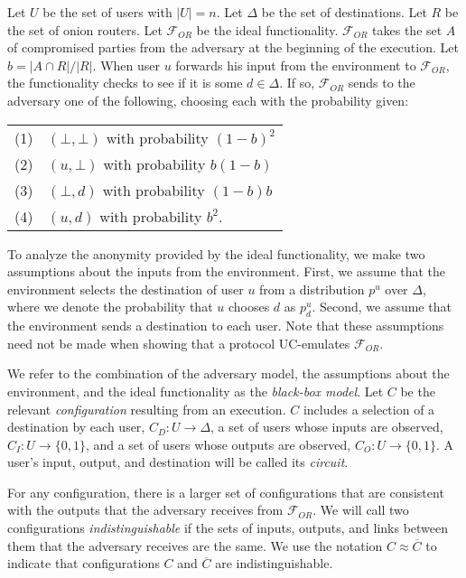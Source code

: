 \documentclass[prodmode,acmtissec]{acmsmall}
\begin{document}
Let $U$ be the set of users with $|U|=n$.  Let $\Delta$ be the set of destinations. Let $R$ be the set of onion routers. Let $\mathcal{F}_{OR}$ be the ideal functionality. $\mathcal{F}_{OR}$ takes the set $A$ of compromised parties from the adversary at the beginning of the execution. Let $b = |A\cap R|/|R|$. When user $u$ forwards his input from the environment to $\mathcal{F}_{OR}$, the functionality checks to see if it is some $d\in \Delta$. If so, $\mathcal{F}_{OR}$ sends to the adversary one of the following, choosing each with the probability given:

\begin{tabular}{ll}
\centering
(1) & $(\bot,\bot)$ with probability $(1-b)^2$\\
(2) & $(u, \bot)$ with probability $b (1-b)$\\
(3) & $(\bot, d)$ with probability $(1-b) b$\\
(4) & $(u,d)$ with probability $b^2$.
\end{tabular}



To analyze the anonymity provided by the ideal functionality, we make two assumptions about the inputs from the environment. First, we assume that the environment selects the destination of user $u$ from a distribution $p^u$ over $\Delta$, where we denote the probability that $u$ chooses $d$ as $p^u_d$. Second, we assume that the environment sends a destination to each user. Note that these assumptions need not be made when showing that a protocol UC-emulates $\mathcal{F}_{OR}$. 

We refer to the combination of the adversary model, the assumptions about the environment, and the ideal functionality as the \emph{black-box model}. Let $C$ be the relevant \emph{configuration} resulting from an execution. $C$ includes a selection of a destination by each user, $C_D : U\rightarrow \Delta$, a set of users whose inputs are observed, $C_I : U\rightarrow \{0,1\}$, and a set of users whose outputs are observed, $C_O : U\rightarrow \{0,1\}$. A user's input, output, and destination will be called its \emph{circuit}.

For any configuration, there is a larger set of configurations that are consistent with the outputs that the adversary receives from $\mathcal{F}_{OR}$.  We will call two configurations \emph{indistinguishable} if the sets of inputs, outputs, and links between them that the adversary receives are the same.
We use the notation $C\approx \overline{C}$ to indicate that configurations $C$ and $\overline{C}$ are indistinguishable.
\end{document}
